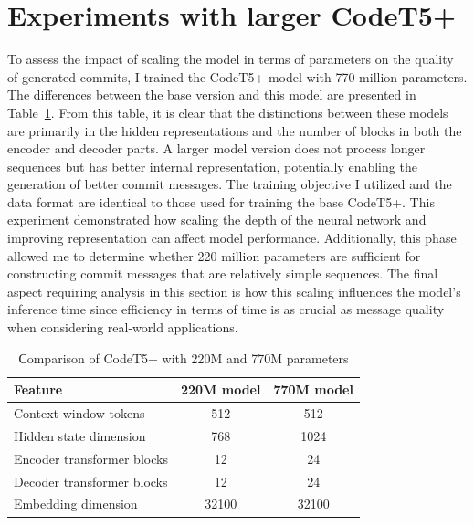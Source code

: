 \section[Larger model experiments]{Experiments with larger CodeT5+}\label{sec:larger_model_experiments}
To assess the impact of scaling the model in terms of parameters on the quality of generated commits, I trained the CodeT5+ model with 770 million parameters. The differences between the base version and this model are presented in Table~\ref{tab:220_vs_770_compare}. From this table, it is clear that the distinctions between these models are primarily in the hidden representations and the number of blocks in both the encoder and decoder parts. A larger model version does not process longer sequences but has better internal representation, potentially enabling the generation of better commit messages. The training objective I utilized and the data format are identical to those used for training the base CodeT5+. This experiment demonstrated how scaling the depth of the neural network and improving representation can affect model performance. Additionally, this phase allowed me to determine whether 220 million parameters are sufficient for constructing commit messages that are relatively simple sequences. The final aspect requiring analysis in this section is how this scaling influences the model's inference time since efficiency in terms of time is as crucial as message quality when considering real-world applications.

\begin{table}[h]
    \centering
    \caption{Сomparison of CodeT5+ with 220M and 770M parameters}\label{tab:220_vs_770_compare}
    \renewcommand{\arraystretch}{1.5} %
    \begin{tabular}{|l|c|c|} %
    \hline %
    \textbf{Feature} & \textbf{220M model} & \textbf{770M model} \\ 
    \hline %
    Context window tokens       & 512 & 512 \\ \hline %
    Hidden state dimension       & 768 & 1024 \\ \hline %
    Encoder transformer blocks    & 12 & 24 \\ \hline %
    Decoder transformer blocks       & 12 & 24 \\ \hline %
    Embedding dimension       & 32100 & 32100 \\ \hline %
    \end{tabular}
\end{table}

